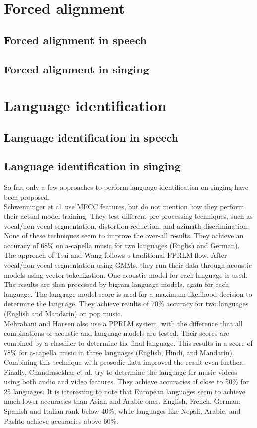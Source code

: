 \section{Forced alignment}
\subsection{Forced alignment in speech}
\subsection{Forced alignment in singing}


\section{Language identification}
\subsection{Language identification in speech}
\subsection{Language identification in singing}
So far, only a few approaches to perform language identification on singing have been proposed.\\
Schwenninger et al. \cite{schwenninger} use MFCC features, but do not mention how they perform their actual model training. They test different pre-processing techniques, such as vocal/non-vocal segmentation, distortion reduction, and azimuth discrimination. None of these techniques seem to improve the over-all results. They achieve an accuracy of 68\% on a-capella music for two languages (English and German).\\
The approach of Tsai and Wang \cite{tsai_wang} follows a traditional PPRLM flow. After vocal/non-vocal segmentation using GMMs, they run their data through acoustic models using vector tokenization. One acoustic model for each language is used. The results are then processed by bigram language models, again for each language. The language model score is used for a maximum likelihood decision to determine the language. They achieve results of 70\% accuracy for two languages (English and Mandarin) on pop music.\\
Mehrabani and Hansen \cite{mehrabani} also use a PPRLM system, with the difference that all combinations of acoustic and language models are tested. Their scores are combined by a classifier to determine the final language. This results in a score of 78\% for a-capella music in three languages (English, Hindi, and Mandarin). Combining this technique with prosodic data improved the result even further.\\
Finally, Chandrasekhar et al.\cite {chandrasekhar} try to determine the language for music videos using both audio and video features. They achieve accuracies of close to 50\% for 25 languages. It is interesting to note that European languages seem to achieve much lower accuracies than Asian and Arabic ones. English, French, German, Spanish and Italian rank below 40\%, while languages like Nepali, Arabic, and Pashto achieve accuracies above 60\%.


